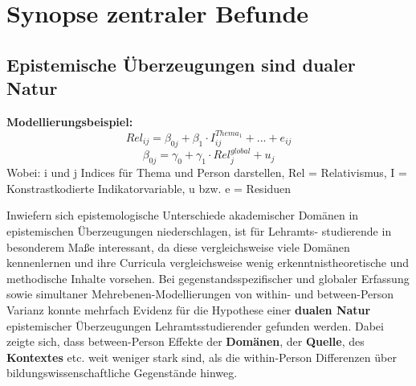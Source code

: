 \documentclass[]{tufte-handout}
\begin{document}
\section{Synopse zentraler Befunde}\label{synopse-zentraler-befunde}

\subsection{Epistemische Überzeugungen sind dualer
Natur}\label{epistemische-uberzeugungen-sind-dualer-natur}

\begin{marginfigure}
\textbf{Modellierungsbeispiel:}
\[Rel_{ij} = \beta_{0j} + \beta_{1} \cdot  I^{Thema_1}_{ij} + ... + e_{ij}\]
\[\beta_{0j} = \gamma_{0} + \gamma_{1} \cdot Rel^{global}_{j} + u_{j}\]
Wobei: i und j Indices für Thema und Person darstellen, Rel =
Relativismus, I = Konstrastkodierte Indikatorvariable, u bzw. e =
Residuen
\end{marginfigure}

Inwiefern sich epistemologische Unterschiede akademischer Domänen in
epistemischen Überzeugungen niederschlagen, ist für Lehramts-
studierende in besonderem Maße interessant, da diese vergleichsweise
viele Domänen kennenlernen und ihre Curricula vergleichsweise wenig
erkenntnistheoretische und methodische Inhalte vorsehen. Bei
gegenstandsspezifischer und globaler Erfassung sowie simultaner
Mehrebenen-Modellierungen von within- und between-Person Varianz konnte
mehrfach Evidenz für die Hypothese einer \textbf{dualen Natur}
epistemischer Überzeugungen Lehramtsstudierender gefunden werden. Dabei
zeigte sich, dass between-Person Effekte der \textbf{Domänen}, der
\textbf{Quelle}, des \textbf{Kontextes} etc. weit weniger stark sind,
als die within-Person Differenzen über bildungswissenschaftliche
Gegenstände hinweg.
\end{document}
